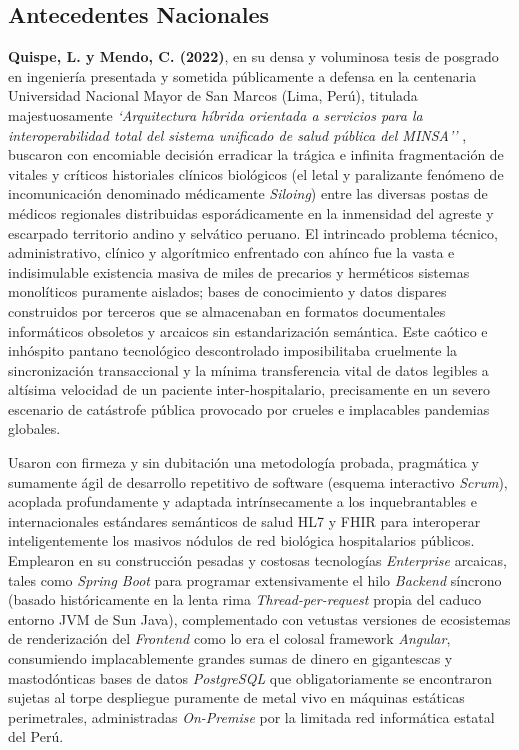 \subsection{Antecedentes Nacionales}

\textbf{Quispe, L. y Mendo, C. (2022)}, en su densa y voluminosa tesis de posgrado en ingeniería presentada y sometida públicamente a defensa en la centenaria Universidad Nacional Mayor de San Marcos (Lima, Perú), titulada majestuosamente \textit{`Arquitectura híbrida orientada a servicios para la interoperabilidad total del sistema unificado de salud pública del MINSA''} \citep{quispe2022}, buscaron con encomiable decisión erradicar la trágica e infinita fragmentación de vitales y críticos historiales clínicos biológicos (el letal y paralizante fenómeno de incomunicación denominado médicamente \textit{Siloing}) entre las diversas postas de médicos regionales distribuidas esporádicamente en la inmensidad del agreste y escarpado territorio andino y selvático peruano. El intrincado problema técnico, administrativo, clínico y algorítmico enfrentado con ahínco fue la vasta e indisimulable existencia masiva de miles de precarios y herméticos sistemas monolíticos puramente aislados; bases de conocimiento y datos dispares construidos por terceros que se almacenaban en formatos documentales informáticos obsoletos y arcaicos sin estandarización semántica. Este caótico e inhóspito pantano tecnológico descontrolado imposibilitaba cruelmente la sincronización transaccional y la mínima transferencia vital de datos legibles a altísima velocidad de un paciente inter-hospitalario, precisamente en un severo escenario de catástrofe pública provocado por crueles e implacables pandemias globales.

Usaron con firmeza y sin dubitación una metodología probada, pragmática y sumamente ágil de desarrollo repetitivo de software (esquema interactivo \textit{Scrum}), acoplada profundamente y adaptada intrínsecamente a los inquebrantables e internacionales estándares semánticos de salud HL7 y FHIR para interoperar inteligentemente los masivos nódulos de red biológica hospitalarios públicos. Emplearon en su construcción pesadas y costosas tecnologías \textit{Enterprise} arcaicas, tales como \textit{Spring Boot} para programar extensivamente el hilo \textit{Backend} síncrono (basado históricamente en la lenta rima \textit{Thread-per-request} propia del caduco entorno JVM de Sun Java), complementado con vetustas versiones de ecosistemas de renderización del \textit{Frontend} como lo era el colosal framework \textit{Angular}, consumiendo implacablemente grandes sumas de dinero en gigantescas y mastodónticas bases de datos \textit{PostgreSQL} que obligatoriamente se encontraron sujetas al torpe despliegue puramente de metal vivo en máquinas estáticas perimetrales, administradas \textit{On-Premise} por la limitada red informática estatal del Perú. 

